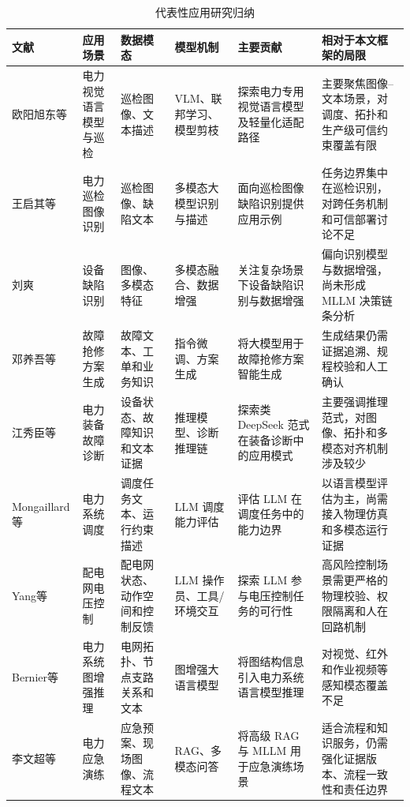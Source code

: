 \documentclass[10.5pt,compsoc]{CjC}
\theoremstyle{mystyle}
\begin{document}
\begin{table}[htbp]
\centering
\caption{代表性应用研究归纳}
\label{tab:representative_studies}
\songti
\setlength{\tabcolsep}{3pt}
\renewcommand{\arraystretch}{1.14}
\begin{tabularx}{\textwidth}{p{} p{} p{} p{} p{} X}
\toprule
文献 & 应用场景 & 数据模态 & 模型机制 & 主要贡献 & 相对于本文框架的局限 \\
\midrule
欧阳旭东等\cite{ouyang2026powervlm} & 电力视觉语言模型与巡检 & 巡检图像、文本描述 & VLM、联邦学习、模型剪枝 & 探索电力专用视觉语言模型及轻量化适配路径 & 主要聚焦图像--文本场景，对调度、拓扑和生产级可信约束覆盖有限 \\
王启其等\cite{wang2025inspection} & 电力巡检图像识别 & 巡检图像、缺陷文本 & 多模态大模型识别与描述 & 面向巡检图像缺陷识别提供应用示例 & 任务边界集中在巡检识别，对跨任务机制和可信部署讨论不足 \\
刘爽\cite{liu2026defect} & 设备缺陷识别 & 图像、多模态特征 & 多模态融合、数据增强 & 关注复杂场景下设备缺陷识别与数据增强 & 偏向识别模型与数据增强，尚未形成 MLLM 决策链条分析 \\
邓养吾等\cite{deng2026repair} & 故障抢修方案生成 & 故障文本、工单和业务知识 & 指令微调、方案生成 & 将大模型用于故障抢修方案智能生成 & 生成结果仍需证据追溯、规程校验和人工确认 \\
江秀臣等\cite{jiang2025deepseek} & 电力装备故障诊断 & 设备状态、故障知识和文本证据 & 推理模型、诊断推理链 & 探索类 DeepSeek 范式在装备诊断中的应用模式 & 主要强调推理范式，对图像、拓扑和多模态对齐机制涉及较少 \\
Mongaillard等\cite{mongaillard2024scheduling} & 电力系统调度 & 调度任务文本、运行约束描述 & LLM 调度能力评估 & 评估 LLM 在调度任务中的能力边界 & 以语言模型评估为主，尚需接入物理仿真和多模态运行证据 \\
Yang等\cite{yang2025operator} & 配电网电压控制 & 配电网状态、动作空间和控制反馈 & LLM 操作员、工具/环境交互 & 探索 LLM 参与电压控制任务的可行性 & 高风险控制场景需更严格的物理校验、权限隔离和人在回路机制 \\
Bernier等\cite{bernier2025powergraph} & 电力系统图增强推理 & 电网拓扑、节点支路关系和文本 & 图增强大语言模型 & 将图结构信息引入电力系统语言模型推理 & 对视觉、红外和作业视频等感知模态覆盖不足 \\
李文超等\cite{liwenchao2025rag} & 电力应急演练 & 应急预案、现场图像、流程文本 & RAG、多模态问答 & 将高级 RAG 与 MLLM 用于应急演练场景 & 适合流程和知识服务，仍需强化证据版本、流程一致性和责任边界 \\
\bottomrule
\end{tabularx}
\end{table}
\end{document}

